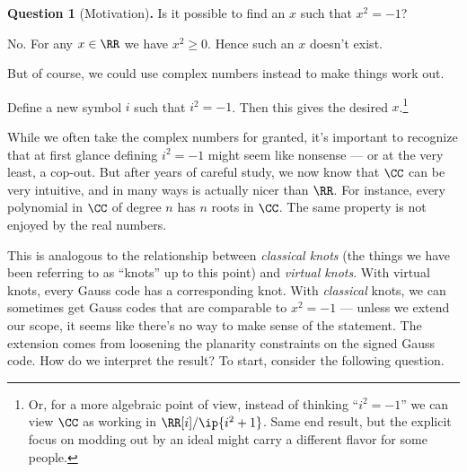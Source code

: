 \noindent \textbf{Question 1} (Motivation)\textbf{.} Is it possible to
find an $x$ such that $x^2 = -1$?
\begin{leftbar}
  \begin{sproof}[Answer 1.]
    No. For any $x \in \RR$ we have $x^2 \geq 0$. Hence such an $x$
    doesn't exist.
  \end{sproof}
\end{leftbar}
But of course, we could use complex numbers instead to make things
work out.
\begin{leftbar}
  \begin{sproof}[Answer 2.]
    Define a new symbol $i$ such that $i^2 = -1$. Then this gives the
    desired $x$.\footnote{Or, for a more algebraic point of view,
      instead of thinking ``$i^2 = -1$'' we can view $\CC$ as working
      in $\RR[i]/\ip{i^2 + 1}$. Same end result, but the explicit
      focus on modding out by an ideal might carry a different flavor
      for some people.}
  \end{sproof}
\end{leftbar}
While we often take the complex numbers for granted, it's important to
recognize that at first glance defining $i^2 = -1$ might seem like
nonsense --- or at the very least, a cop-out. But after years of
careful study, we now know that $\CC$ can be very intuitive, and in
many ways is actually nicer than $\RR$. For instance, every polynomial
in $\CC$ of degree $n$ has $n$ roots in $\CC$. The same property is
not enjoyed by the real numbers.

This is analogous to the relationship between \emph{classical knots}
(the things we have been referring to as ``knots'' up to this point)
and \emph{virtual knots}. With virtual knots, every Gauss code has a
corresponding knot. With \emph{classical} knots, we can sometimes get
Gauss codes that are comparable to $x^2 = -1$ --- unless we extend our
scope, it seems like there's no way to make sense of the statement.
The extension comes from loosening the planarity constraints on the
signed Gauss code. How do we interpret the result? To start,
consider the following question.\\

